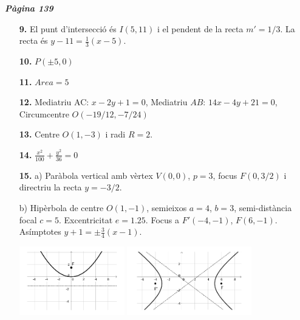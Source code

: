 \documentclass[a4paper, pdf, twoside]{book}
\begin{document}
\begin{multicols}{2}

{\textbf{\em Pàgina 139}} \hrulefill
\begin{enumerate}
\vspace{0.25cm}
\item[\fontfamily{phv}\selectfont\color{blue}\textbf{9. }]  \scalebox{0.6}{\simbolclau } 
El punt d'intersecció és $I(5,11)$ i el pendent de la recta $m'=1/3$. La recta és $y-11=\frac {1}{3}(x-5)$.
 \end{enumerate}
\begin{enumerate}
\vspace{0.25cm}
\item[\fontfamily{phv}\selectfont\color{blue}\textbf{10. }]  \scalebox{0.6}{\simbolclau } 
$P(\pm 5, 0)$
\vspace{0.25cm}
\item[\fontfamily{phv}\selectfont\color{blue}\textbf{11. }]  \scalebox{0.6}{\simbolclau } 
$Area=5$
\vspace{0.25cm}
\item[\fontfamily{phv}\selectfont\color{blue}\textbf{12. }]  \scalebox{0.6}{\simbolclau } 
Mediatriu AC: $x-2y+1=0$, Mediatriu $AB$: $14x-4y+21=0$, Circumcentre $O(-19/12, -7/24)$
\vspace{0.25cm}
\item[\fontfamily{phv}\selectfont\color{blue}\textbf{13. }]  \scalebox{0.6}{\simbolclau } 
Centre $O(1,-3)$ i radi $R=2$.
\vspace{0.25cm}
\item[\fontfamily{phv}\selectfont\color{blue}\textbf{14. }]  \scalebox{0.6}{\simbolclau } 
$\frac {x^2}{100}+\frac {y^2}{36}=0$
\vspace{0.25cm}
\item[\fontfamily{phv}\selectfont\color{blue}\textbf{15. }]  \scalebox{0.6}{\simbolclau } 
 a) Paràbola vertical amb vèrtex $V(0,0)$, $p=3$, focus $F(0,3/2)$ i directriu la recta $y=-3/2$. \par b) Hipèrbola de centre $O(1,-1)$, semieixos $a=4$, $b=3$, semi-distància focal $c=5$. Excentricitat $e=1.25$. Focus a $F'(-4,-1)$, $F(6,-1)$. Asímptotes $y+1=\pm \frac {3}{4}(x-1)$. \par \begin {center} \includegraphics [height=3cm]{img-10-bloc3/bloc3-sol-14a} \includegraphics [height=3cm]{img-10-bloc3/bloc3-sol-14b} \end {center} 

\end{enumerate}
\end{multicols}
\end{document}
